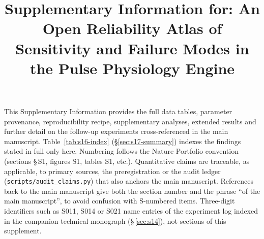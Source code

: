 \documentclass[pdflatex,sn-nature]{sn-jnl}%
\begin{document}
\title[Supplementary Information]{Supplementary Information for: An Open Reliability Atlas of Sensitivity and Failure Modes in the Pulse Physiology Engine}

\author*[1,2,3,4,5]{ }

\author[3,4,6]{ }

\author[3]{ }

\author[4,5]{ }

\author[1,2,3]{ }

\author[1,2,3]{ }







\maketitle

\noindent This Supplementary Information provides the full data tables, parameter provenance, reproducibility recipe, supplementary analyses, extended results and further detail on the follow-up experiments cross-referenced in the main manuscript. Table~\ref{tab:s16-index} (\S\ref{sec:s17-summary}) indexes the findings stated in full only here. Numbering follows the Nature Portfolio convention (sections \S\,S1, figures S1, tables S1, etc.). Quantitative claims are traceable, as applicable, to primary sources, the preregistration or the audit ledger (\texttt{scripts/audit\_claims.py}) that also anchors the main manuscript. References back to the main manuscript give both the section number and the phrase ``of the main manuscript'', to avoid confusion with S-numbered items. Three-digit identifiers such as S011, S014 or S021 name entries of the experiment log indexed in the companion technical monograph (\S\,\ref{sec:s14}), not sections of this supplement.
\end{document}
